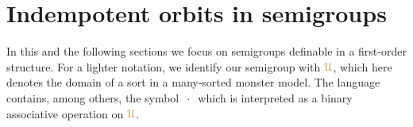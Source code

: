\documentclass[creche.tex]{subfiles}
\begin{document}
\begin{comment}
\begin{proof}
We can assume that $\mrA$, $\mrB$ and $\mrC$ are $M$-orbits of elements of $\mrU$.
Say ${\mr a}$, ${\mr b}$, and ${\mr c}$ respectively.
As we are working over models,
we can assume that ${\mr a}\nonforkc_{\!A}{\mr b}$ and ${\mr a}{\cdot}{\mr b}\nonforkc_{\!A}{\mr c}$.
By Proposition~\ref{prop_orbits_main} the set on the l.h.s.\@ equals $\O({\mr a}{\cdot}{\mr b}{\cdot}{\mr c}/M)$.
By a similar argument the set on the r.h.s.\@ equals $\O({\mr a'}{\cdot}{\mr b'}{\cdot}{\mr c'}/M)$ for some elements ${\mr a'}$, ${\mr b'}$, and ${\mr c'}$.
Proposition~\ref{prop_semi_associative} proves that inclusion $\subseteq$ holds in general.
But inclusion between orbits amounts to equality.
\end{proof}

\begin{lemma}\label{lem_Hindman}
Assume $\nonforkc_{\!M}$ is $1$-stationary and let $M$ be a model.
If $\mrA$ is minimal among the  $M$-invariant,
idempotent,
type-definable sets then $\mrA=\O({\mr a}/M)$ for some element ${\mr a}$.
\end{lemma}
\begin{proof}
By Corollary~\ref{corol_min_idempotent},
for every ${\mr a}\in\mrA$ the set $\O({\mr a}/M)\cdot_{\!M}\mrA$ is idempotent.
It is also type-definable and contained in $\mrA$,
therefore by minimality $\O({\mr a}/M)\cdot_{\!M}\mrA=\mrA$.
Then there is a ${\mr b}\in\mrA$ such that ${\mr a}\nonforkc_M{\mr b}$ and ${\mr a}{\cdot}{\mr b}={\mr a}$.
By associativity, the set $\O({\mr a}/M)\cdot_{\!M}\O({\mr b}/M)$ is idempotent.
By Corollary~\ref{corol_orbits_associative},
it coincides with $\O({\mr a}/M)$.
The theorem follows by minimality.
\end{proof}
\end{comment}

\section{Indempotent orbits in semigroups}\label{semigroups}

\def\medrel#1{\parbox[t]{6ex}{$\displaystyle\hfil #1$}}
\def\ceq#1#2#3{\parbox[t]{22ex}{$\displaystyle #1$}\medrel{#2}{$\displaystyle #3$}}

In this and the following sections we focus on semigroups definable in a first-order structure.
For a lighter notation, we identify our semigroup with ${\color{brown}\EuScript U}$,
which here denotes the domain of a sort in a many-sorted monster model.
The language contains, among others,
the symbol \emph{$\ \cdot\ $} which is interpreted as a binary associative operation on ${\color{brown}\EuScript U}$.
\end{document}
